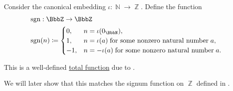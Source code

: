 \begin{definition}\label{def:integer_signum}\mimprovised
  Consider the canonical embedding \( \iota: \BbbN \to \BbbZ \). Define the  function
  \begin{equation*}
    \begin{aligned}
      &\sgn: \BbbZ \to \BbbZ \\
      &\sgn(n) \coloneqq \begin{cases}
        0,  &n = \iota(0_\BbbN), \\
        1,  &n = \iota(a) \T{for some nonzero natural number} a, \\
        -1, &n = -\iota(a) \T{for some nonzero natural number} a.
      \end{cases}
    \end{aligned}
  \end{equation*}

  This is a well-defined \hyperref[def:set_valued_map/partial]{total function} due to .
\end{definition}
\begin{comments}
  \item We will later show that this matches the signum function on \( \BbbZ \) defined in .
\end{comments}

